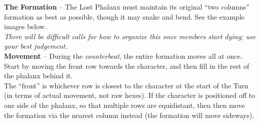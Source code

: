 \textbf{The Formation} -- The Lost Phalanx must maintain its original “two columns” formation as best as possible, though it may snake and bend. See the example images below.\\
\emph{There will be difficult calls for how to organize this once members start dying; use your best judgement.}\\

\textbf{Movement} -- During the \emph{counterbeat}, the entire formation moves all at once. Start by moving the front row towards the character, and then fill in the rest of the phalanx behind it.\\
The “front” is whichever row is closest to the character at the start of the Turn (in terms of actual movement, not raw hexes). If the character is positioned off to one side of the phalanx, so that multiple rows are equidistant, then then move the formation via the nearest column instead (the formation will move sideways).

